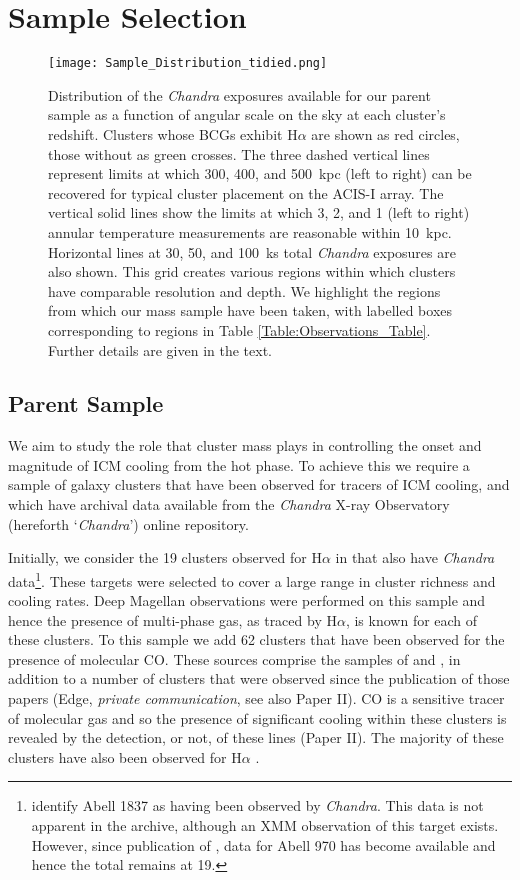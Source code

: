 \documentclass[twocolumn]{aastex6}
\begin{document}
\section{Sample Selection} \label{Section:Sample}

\begin{figure}
	\texttt{[image: Sample\_Distribution\_tidied.png]}
    \caption{Distribution of the {\it Chandra} exposures available for our parent sample as a function of angular scale on the sky at each cluster's redshift.  Clusters whose BCGs exhibit H$\alpha$ are shown as red circles, those without as green crosses.  The three dashed vertical lines represent limits at which 300, 400, and 500~kpc (left to right) can be recovered for typical cluster placement on the ACIS-I array.  The vertical solid lines show the limits at which 3, 2, and 1 (left to right) annular temperature measurements are reasonable within 10~kpc.  Horizontal lines at 30, 50, and 100~ks total {\it Chandra} exposures are also shown.  This grid creates various regions within which clusters have comparable resolution and depth.  We highlight the regions from which our mass sample have been taken, with labelled boxes corresponding to regions in Table \ref{Table:Observations_Table}.  Further details are given in the text.}
    \label{Figure:Sample_Distribution}
\end{figure}

\subsection{Parent Sample}
We aim to study the role that cluster mass plays in controlling the onset and magnitude of ICM cooling from the hot phase.  To achieve this we require a sample of galaxy clusters that have been observed for tracers of ICM cooling, and which have archival data available from the {\it Chandra} X-ray Observatory (hereforth `{\it Chandra}') online repository.

Initially, we consider the 19 clusters observed for H$\alpha$ in \citet[][]{McDonald10} that also have {\it Chandra} data\footnote{\citet[][]{McDonald10} identify Abell 1837 as having been observed by {\it Chandra}.  This data is not apparent in the archive, although an XMM observation of this target exists.  However, since publication of \citet[][]{McDonald10}, data for Abell 970 has become available and hence the total remains at 19.}.  These targets were selected to cover a large range in cluster richness and cooling rates.  Deep Magellan observations were performed on this sample and hence the presence of multi-phase gas, as traced by H$\alpha$, is known for each of these clusters.  To this sample we add 62 clusters that have been observed for the presence of molecular CO.  These sources comprise the samples of \citet[][]{Edge01} and \citet[][]{Salome03}, in addition to a number of clusters that were observed since the publication of those papers (Edge, {\it private communication}, see also Paper II).  CO is a sensitive tracer of molecular gas and so the presence of significant cooling within these clusters is revealed by the detection, or not, of these lines (Paper II).  The majority of these clusters have also been observed for H$\alpha$ \cite[][]{Crawford99,Cavagnolo09,Rawle12}.
\end{document}
